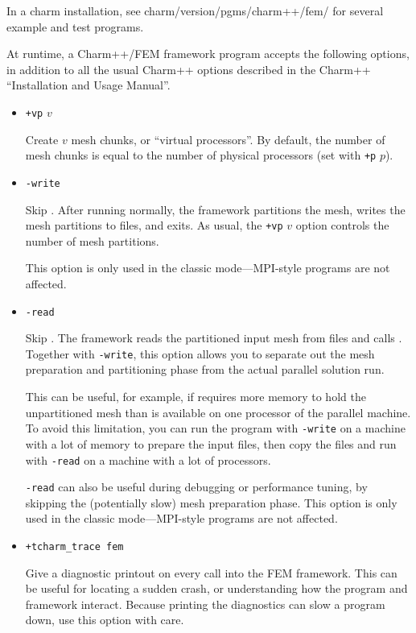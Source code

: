\documentclass[10pt]{article}
\begin{document}
In a charm installation, see charm/version/pgms/charm++/fem/
for several example and test programs.

At runtime, a Charm++/FEM framework program accepts the following
options, in addition to all the usual Charm++ options described in 
the Charm++ ``Installation and Usage Manual''.

\begin{itemize}
\item {\tt +vp} $v$  

Create $v$ mesh chunks, or ``virtual processors''.
By default, the number of mesh chunks is equal to the number of 
physical processors (set with {\tt +p} $p$).


\item {\tt -write}

Skip .
After running  normally, the framework partitions the mesh, 
writes the mesh partitions to files, and exits.  As usual, the
{\tt +vp} $v$ option controls the number of mesh partitions.

This option is only used in the classic mode---MPI-style programs
are not affected.


\item {\tt -read}

Skip .
The framework reads the partitioned input mesh from files
and calls .  Together with {\tt -write}, this option
allows you to separate out the mesh preparation and partitioning 
phase from the actual parallel solution run.

This can be useful, for example, if  requires more memory 
to hold the unpartitioned mesh than is available on one processor of 
the parallel machine.  To avoid this limitation, you can run the program
with {\tt -write} on a machine with a lot of memory to prepare the input
files, then copy the files and run with {\tt -read} on a machine with 
a lot of processors.

{\tt -read} can also be useful during debugging or performance tuning, 
by skipping the (potentially slow) mesh preparation phase.
This option is only used in the classic mode---MPI-style programs
are not affected.


\item {\tt +tcharm\_trace fem}

Give a diagnostic printout on every call into the FEM framework.
This can be useful for locating a sudden crash, or understanding
how the program and framework interact.  Because printing the 
diagnostics can slow a program down, use this option with care.

\end{itemize}
\end{document}
